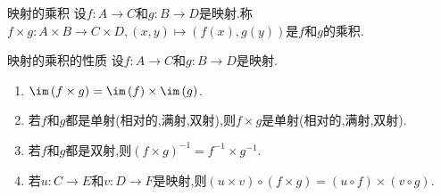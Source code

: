 \begin{definition}{映射的乘积}{}
	设$f:A\to C$和$g:B\to D$是映射.称$f\times g:A\times B\to C\times D,\left(x,y\right)\mapsto\left(f\left(x\right),g\left(y\right)\right)$是$f$和$g$的乘积.
\end{definition}

\begin{proposition}{映射的乘积的性质}{}
	设$f:A\to C$和$g:B\to D$是映射.
	\begin{enumerate}
		\item $\im\left(f\times g\right)=\im\left(f\right)\times\im\left(g\right)$.
		\item 若$f$和$g$都是单射(相对的,满射,双射),则$f\times g$是单射(相对的,满射,双射).
		\item 若$f$和$g$都是双射,则$\left(f\times g\right)^{-1}=f^{-1}\times g^{-1}$.
		\item 若$u:C\to E$和$v:D\to F$是映射,则$\left(u\times v\right)\circ\left(f\times g\right)=\left(u\circ f\right)\times\left(v\circ g\right)$.
	\end{enumerate}
\end{proposition}































